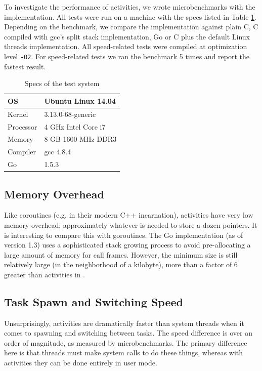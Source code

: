 \documentclass[sigplan,10pt,review,anonymous]{acmart}\settopmatter{printfolios=true,printccs=false,printacmref=false}
\begin{document}
To investigate the performance of activities, we wrote microbenchmarks with the \charcoal{} implementation.
All tests were run on a machine with the specs listed in Table \ref{table:specs}.
Depending on the benchmark, we compare the \charcoal{} implementation against plain C, C compiled with gcc's split stack implementation, Go or C plus the default Linux threads implementation.
All speed-related tests were compiled at optimization level \texttt{-O2}.
For speed-related tests we ran the benchmark 5 times and report the fastest result.

\begin{table}
  \centering
  \begin{tabular}{|l|l|}
    \hline
    OS & Ubuntu Linux 14.04 \\
    \hline
    Kernel & 3.13.0-68-generic \\
    \hline
    Processor & 4 GHz Intel Core i7 \\
    \hline
    Memory & 8 GB 1600 MHz DDR3 \\
    \hline
    Compiler & gcc 4.8.4 \\
    \hline
    Go & 1.5.3 \\
    \hline
  \end{tabular}
  \caption{Specs of the test system}
  \label{table:specs}
\end{table}

\subsection{Memory Overhead}

Like coroutines (e.g. in their modern C++ incarnation), activities have very low memory overhead; approximately whatever is needed to store a dozen pointers.
It is interesting to compare this with goroutines.
The Go implementation (as of version 1.3) uses a sophisticated stack growing process to avoid pre-allocating a large amount of memory for call frames.
However, the minimum size is still relatively large (in the neighborhood of a kilobyte), more than a factor of 6 greater than activities in \charcoal{}.

\subsection{Task Spawn and Switching Speed}

Unsurprisingly, activities are dramatically faster than system threads when it comes to spawning and switching between tasks.
The speed difference is over an order of magnitude, as measured by microbenchmarks.
The primary difference here is that threads must make system calls to do these things, whereas with activities they can be done entirely in user mode.
\end{document}
